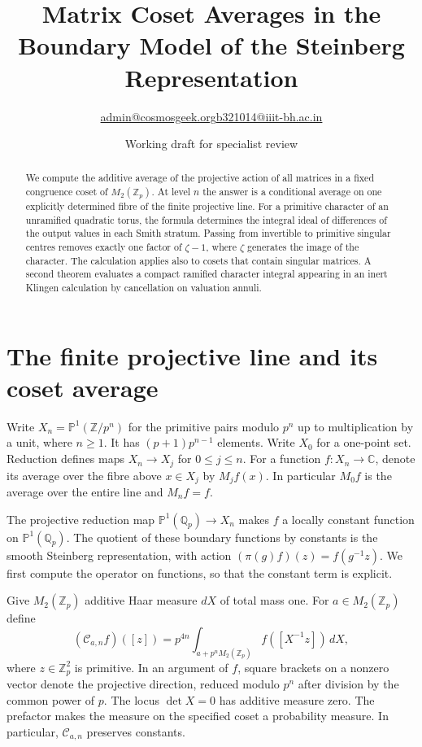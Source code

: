 \documentclass[11pt]{article}
\title{Matrix Coset Averages in the Boundary Model of the Steinberg Representation}
\author{\small \href{mailto:admin@cosmosgeek.org}{admin@cosmosgeek.org}\qquad \href{mailto:b321014@iiit-bh.ac.in}{b321014@iiit-bh.ac.in}}
\date{Working draft for specialist review}
\newcommand{\Zp}{\mathbb Z_p}
\newcommand{\Qp}{\mathbb Q_p}
\newcommand{\PP}{\mathbb P^1}
\begin{document}
\maketitle
\begin{abstract}
We compute the additive average of the projective action of all matrices
in a fixed congruence coset of $M_2(\mathbb Z_p)$. At level $n$ the
answer is a conditional average on one explicitly determined fibre of
the finite projective line. For a primitive character of an unramified
quadratic torus, the formula determines the integral ideal of
differences of the output values in each Smith stratum. Passing from
invertible to primitive singular centres removes exactly one factor
of $\zeta-1$, where $\zeta$ generates the image of the character.
The calculation applies also to cosets that contain singular matrices.
A second theorem evaluates a compact ramified character integral appearing
in an inert Klingen calculation by cancellation on valuation annuli.
\end{abstract}

\section{The finite projective line and its coset average}

Write $X_n=\mathbb P^1(\mathbb Z/p^n)$ for the primitive pairs modulo
$p^n$ up to multiplication by a unit, where $n\ge1$.
It has $(p+1)p^{n-1}$ elements. Write $X_0$ for a one-point set.
Reduction defines maps $X_n\to X_j$ for $0\le j\le n$.
For a function $f:X_n\to\mathbb C$, denote its average over the
fibre above $x\in X_j$ by $M_j f(x)$. In particular $M_0 f$ is
the average over the entire line and $M_n f=f$.

The projective reduction map $\PP(\Qp)\to X_n$ makes $f$ a locally
constant function on $\PP(\Qp)$. The quotient of these boundary
functions by constants is the smooth Steinberg representation,
with action $(\pi(g)f)(z)=f(g^{-1}z)$. We first compute the operator
on functions, so that the constant term is explicit.

Give $M_2(\Zp)$ additive Haar measure $dX$ of total mass one. For
$a\in M_2(\Zp)$ define
\[
 (\mathcal C_{a,n}f)([z])
 =p^{4n}\int_{a+p^nM_2(\Zp)} f([X^{-1}z])\,dX ,
\]
where $z\in\Zp^2$ is primitive. In an argument of $f$, square
brackets on a nonzero vector denote the projective direction,
reduced modulo $p^n$ after division by the common power of $p$.
The locus $\det X=0$ has additive measure zero. The prefactor makes
the measure on the specified coset a probability measure. In
particular, $\mathcal C_{a,n}$ preserves constants.
\end{document}
